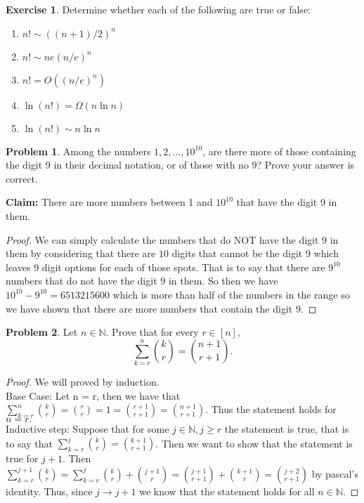 \documentclass[11pt, letter]{amsart}
\theoremstyle{definition}
\newtheorem{problem}{Problem}[]
\newtheorem{exercise}{Exercise}[]
\begin{document}
\begin{exercise}
  Determine whether each of the following are true or false:
  \begin{enumerate}[label=(\alph*)]
  \item $n! \sim \left((n + 1) / 2\right)^n$
  \item $n! \sim ne(n / e)^n$
  \item $n! = O((n / e)^n)$
  \item $\ln(n!) = \Omega(n \ln n)$
  \item $\ln(n!) \sim n\ln n$
  \end{enumerate}
\end{exercise}
\clearpage

\begin{problem}
  Among the numbers $1, 2, \dots, 10^{10}$, are there more of those containing the digit 9 in their decimal notation, or of those with no $9$?  Prove your answer is correct.
  
\textbf{Claim:} There are more numbers between 1 and $10^{10}$ that have the digit 9 in them.
\begin{proof}
We can simply calculate the numbers that do NOT have the digit $9$ in them by considering that there are $10$ digits that cannot be the digit $9$ which leaves $9$ digit options for each of those spots. That is to say that there are $9^10$ numbers that do not have the digit $9$ in them. So then we have $10^10 - 9^10 = 6513215600$ which is more than half of the numbers in the range so we have shown that there are more numbers that contain the digit $9$.
\end{proof}

\end{problem}

\clearpage
\begin{problem}
  Let $n \in \mathbb N$.  Prove that for every $r \in [n]$,
  \begin{equation*}
    \sum_{k=r}^n \binom{k}{r} = \binom{n + 1}{r + 1}.
  \end{equation*}

\begin{proof}
We will proved by induction.\\
Base Case: Let n = r, then we have that $\sum_{k = r}^n\binom{k}{r} = \binom{r}{r} = 1 = \binom{r + 1}{r + 1} = \binom{n + 1}{r + 1}$. Thus the statement holds for $n = r.$\\
Inductive step: Suppose that for some $j\in \mathbb{N}, j \geq r$ the statement is true, that is to say that $\sum_{k = r}^j\binom{k}{r} = \binom{k + 1}{r + 1}$. Then we want to show that the statement is true for $j + 1.$ Then $\sum_{k = r}^{j + 1}\binom{k}{r} = \sum_{k = r}^j\binom{k}{r} + \binom{j + 1}{r} = \binom{j + 1}{r + 1} + \binom{k + 1}{r} = \binom{j + 2}{r + 1}$ by pascal's identity. Thus, since $j \rightarrow j + 1$ we know that the statement holds for all $n \in \mathbb{N}.$
\end{proof}

\end{problem}
\end{document}
